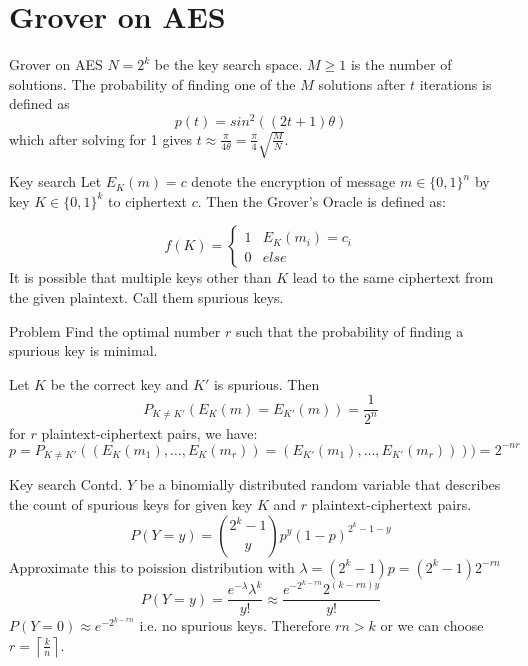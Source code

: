 \section{Grover on AES}

\begin{frame}{Grover on AES}
$N=2^k$ be the key search space. \pause $M \geq 1$ is the number of solutions. \pause The probability of finding one of the $M$ solutions after $t$ iterations is defined as 
\pause
\begin{equation*}
    p(t) = sin^2((2t+1)\theta)
\end{equation*}
\pause
which after solving for 1 gives $t\approx \frac{\pi}{4\theta} = \frac{\pi}{4} \sqrt{\frac{M}{N}}$.
\end{frame}
\begin{frame}{Key search}
Let $E_K(m) = c$ denote the encryption of message $m \in \{ 0,1\}^n$ by key $K\in \{0,1\}^k$ to ciphertext $c$. \pause Then the Grover's Oracle is defined as:

\begin{equation*}
 f(K) = 
 \begin{cases} 
      1 & E_K(m_i) = c_i  \\
      0 & else 
  \end{cases}
\end{equation*}
\pause
It is possible that multiple keys other than $K$ lead to the same ciphertext from the given plaintext. \pause Call them spurious keys.

\pause
\begin{block}{Problem}
Find the optimal number $r$ such that the probability of finding a spurious key is minimal.
\end{block}
\pause
Let $K$ be the correct key and $K'$ is spurious. Then
\pause
\begin{equation*}
    P_{K \not = K'}(E_K(m) = E_{K'}(m)) = \frac{1}{2^n}
\end{equation*}
\pause
for $r$ plaintext-ciphertext pairs, we have:
\pause
\begin{equation*}
    p = P_{K \not = K'}((E_K(m_1), \dots ,E_K(m_r) ) = (E_{K'}(m_1), \dots, E_{K'}(m_r)) )) = 2^{-nr}
\end{equation*}
\end{frame}
\begin{frame}{Key search Contd.}
    $Y$ be a binomially distributed random variable that describes the count of spurious keys for given key $K$ and $r$ plaintext-ciphertext pairs.
    \pause
    \begin{equation*}
    P(Y = y) = {2^k - 1 \choose y} p^y(1-p)^{2^k - 1- y}
\end{equation*}
\pause
Approximate this to poission distribution with $\lambda = (2^k-1)p = (2^k - 1)2^{-rn} $
\pause
\begin{equation*}
    P(Y=y) = \frac{e^{-\lambda}\lambda^k}{y!} \approx  \frac{e^{-2^{k-rn}}2^{(k-rn)y}}{y!}
\end{equation*}
\pause
$P(Y = 0) \approx e^{-2^{k-rn}}$ i.e. no spurious keys. \pause Therefore $rn > k$ or we can choose $r = \left\lceil \frac{k}{n} \right\rceil$.
\end{frame}
